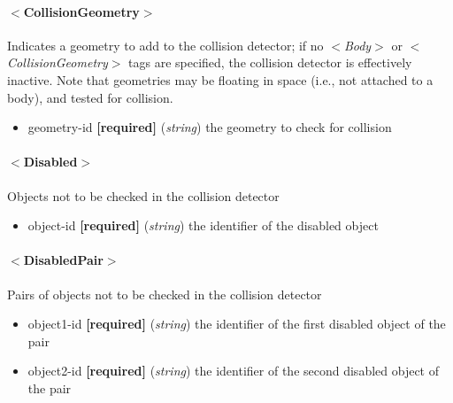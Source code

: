 \documentclass{article}
\begin{document}
\begin{landscape}
\paragraph{$<$CollisionGeometry$>$}
Indicates a geometry to add to the collision detector; if no $<$\emph{Body}$>$ or $<$\emph{CollisionGeometry}$>$ tags are specified, the collision detector is effectively inactive.  Note that geometries may be floating in space (i.e., not attached to a body), and tested for collision.
\begin{itemize}
\item geometry-id  \textbf{[required]}  (\emph{string})  the geometry to check for collision
\end{itemize}

\paragraph{$<$Disabled$>$}
Objects not to be checked in the collision detector
\begin{itemize}
\item object-id \textbf{[required]} (\emph{string}) the identifier of the disabled object 
\end{itemize} 

\paragraph{$<$DisabledPair$>$}
Pairs of objects not to be checked in the collision detector
\begin{itemize}
\item object1-id \textbf{[required]} (\emph{string}) the identifier of the first disabled object of the pair 
\item object2-id \textbf{[required]} (\emph{string}) the identifier of the second disabled object of the pair 
\end{itemize} 


\end{landscape}
\end{document}
